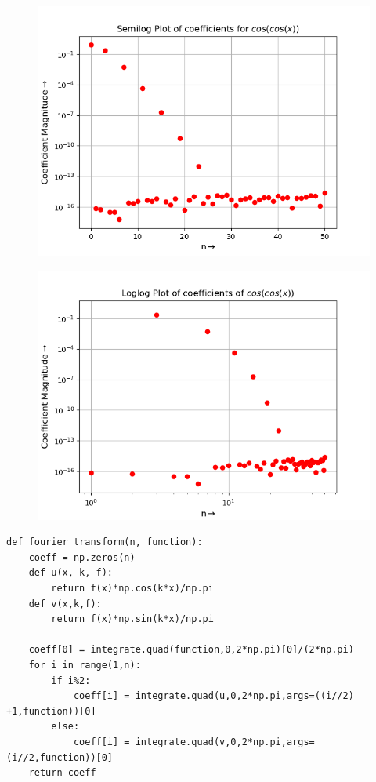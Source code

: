 \documentclass[11pt, a4paper]{article}
\begin{document}
\begin{figure}
\centering
\begin{minipage}{.5\textwidth}
  \centering
  \includegraphics[width=0.9\linewidth]{fig5.png}
  \label{fig:test1}
\end{minipage}%
\begin{minipage}{.5\textwidth}
  \centering
  \includegraphics[width=\linewidth]{fig6.png}
  \label{fig:test2}
\end{minipage}
\end{figure}

 \begin{verbatim}	
def fourier_transform(n, function):
    coeff = np.zeros(n)
    def u(x, k, f):
        return f(x)*np.cos(k*x)/np.pi
    def v(x,k,f):
        return f(x)*np.sin(k*x)/np.pi

    coeff[0] = integrate.quad(function,0,2*np.pi)[0]/(2*np.pi)
    for i in range(1,n):
        if i%2:
            coeff[i] = integrate.quad(u,0,2*np.pi,args=((i//2) +1,function))[0]
        else:
            coeff[i] = integrate.quad(v,0,2*np.pi,args=(i//2,function))[0]
    return coeff 
\end{verbatim}
 
\end{document}
